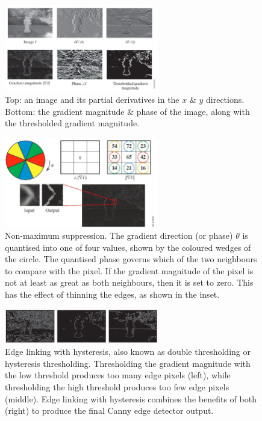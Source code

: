 \documentclass[a4paper,11pt]{article}
\begin{document}
\begin{figure}[H]
    \centering
    \includegraphics[width=0.6\textwidth]{images/cannyedgedetails.png}
    \caption{
        Top: an image and its partial derivatives in the $x$ \& $y$ directions.
        Bottom: the gradient magnitude \& phase of the image, along with the thresholded gradient magnitude.
    }
\end{figure}


\begin{figure}[H]
    \centering
    \includegraphics[width=0.6\textwidth]{images/cannynonmaxsuppression.png}
    \caption{
        Non-maximum suppression.
        The gradient direction (or phase) $\theta$ is quantised into one of four values, shown by the coloured wedges of the circle.
        The quantised phase governs which of the two neighbours to compare with the pixel.
        If the gradient magnitude of the pixel is not at least as great as both neighbours, then it is set to zero.
        This has the effect of thinning the edges, as shown in the inset.
    }
\end{figure}

\begin{figure}[H]
    \centering
    \includegraphics[width=0.6\textwidth]{images/cannyedgelinking.png}
    \caption{
        Edge linking with hysteresis, also known as double thresholding or hysteresis thresholding.
        Thresholding the gradient magnitude with the low threshold produces too many edge pixels (left), while thresholding the high threshold produces too few edge pixels (middle).
        Edge linking with hysteresis combines the benefits of both (right) to produce the final Canny edge detector output.
    }
\end{figure}
\end{document}
